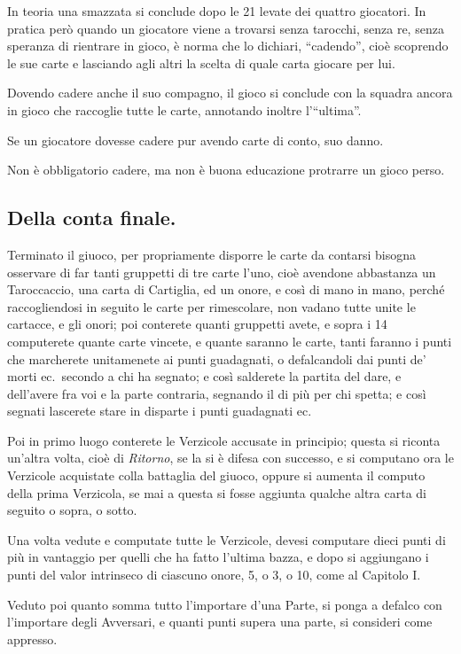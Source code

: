 \documentclass[11pt,a6paper]{article}
\begin{document}
In teoria una smazzata si conclude dopo le 21 levate dei quattro giocatori.
In pratica però quando un giocatore viene a trovarsi senza tarocchi, senza
re, senza speranza di rientrare in gioco, è norma che lo dichiari,
``cadendo'', cioè scoprendo le sue carte e lasciando agli altri la scelta di
quale carta giocare per lui.

Dovendo cadere anche il suo compagno, il gioco si conclude con la squadra
ancora in gioco che raccoglie tutte le carte, annotando inoltre
l'``ultima''.

Se un giocatore dovesse cadere pur avendo carte di conto, suo danno.

Non è obbligatorio cadere, ma non è buona educazione protrarre un gioco perso.

\subsection{Della conta finale.}

Terminato il giuoco, per propriamente disporre le carte da contarsi bisogna osservare di far tanti gruppetti di tre carte l'uno, cioè avendone abbastanza un Taroccaccio, una carta di Cartiglia, ed un onore, e così di mano in mano, perché raccogliendosi in seguito le carte per rimescolare, non vadano tutte unite le cartacce, e gli onori; poi conterete quanti gruppetti avete, e sopra i 14 computerete quante carte vincete, e quante saranno le carte, tanti faranno i punti che marcherete unitamenete ai punti guadagnati, o defalcandoli dai punti de' morti ec.\ secondo a chi ha segnato; e così salderete la partita del dare, e dell'avere fra voi e la parte contraria, segnando il di più per chi spetta; e così segnati lascerete stare in disparte i punti guadagnati ec.

Poi in primo luogo conterete le Verzicole accusate in principio; questa si riconta un'altra volta, cioè di \textit{Ritorno}, se la si è difesa con successo, e si computano ora le Verzicole acquistate colla battaglia del giuoco, oppure si aumenta il computo della prima Verzicola, se mai a questa si fosse aggiunta qualche altra carta di seguito o sopra, o sotto.

Una volta vedute e computate tutte le Verzicole, devesi computare dieci punti di più in vantaggio per quelli che ha fatto l'ultima bazza, e dopo si aggiungano i punti del valor intrinseco di ciascuno onore, 5, o 3, o 10, come al Capitolo I.

Veduto poi quanto somma tutto l'importare d'una Parte, si ponga a defalco
con l'importare degli Avversari, e quanti punti supera una parte, si
consideri come appresso.
\end{document}
